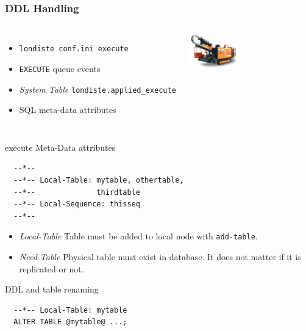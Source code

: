 \documentclass{beamer}
\begin{document}
\begin{frame}[fragile]
  \frametitle{DDL Handling}

\begin{columns}[c]

  \begin{itemize}
    \item \texttt{londiste conf.ini execute}
    \item \texttt{EXECUTE} queue events
    \item \textit{System Table} \texttt{londiste.applied\_execute}
    \item SQL meta-data attributes
  \end{itemize}

\begin{center}
  \includegraphics[height=4em]{Horizontal-Directional-Drilling-Rig-DDL-800-.jpg}
\end{center}
\end{columns}
\end{frame}

\begin{frame}[fragile]{execute Meta-Data attributes}
\begin{verbatim}
  --*--
  --*-- Local-Table: mytable, othertable,
  --*--              thirdtable
  --*-- Local-Sequence: thisseq
  --*--
\end{verbatim}

\begin{itemize}
\item \textit{Local-Table}
  Table must be added to local node with \texttt{add-table}.
\item \textit{Need-Table}
    Physical table must exist in database.  It does not matter if it is
    replicated or not.
\end{itemize}
\end{frame}

\begin{frame}[fragile]{DDL and table renaming}
  
\begin{verbatim}
  --*-- Local-Table: mytable
  ALTER TABLE @mytable@ ...;
\end{verbatim}

\end{frame}
\end{document}
